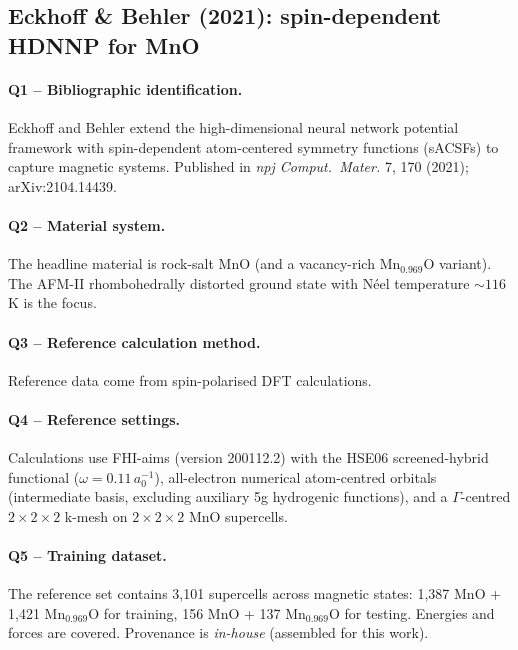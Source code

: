 \subsection{Eckhoff \& Behler (2021): spin-dependent HDNNP for MnO}
\label{sec:appendix-example-eckhoff2021spin}

\paragraph{Q1 -- Bibliographic identification.}
Eckhoff and Behler extend the high-dimensional neural network potential
framework with spin-dependent atom-centered symmetry functions (sACSFs)
to capture magnetic systems. Published in \emph{npj Comput.\ Mater.} 7,
170 (2021); arXiv:2104.14439.


\paragraph{Q2 -- Material system.}
The headline material is rock-salt MnO (and a vacancy-rich
Mn$_{0.969}$O variant). The AFM-II rhombohedrally distorted ground
state with N\'eel temperature ${\sim}116$\,K is the focus.


\paragraph{Q3 -- Reference calculation method.}
Reference data come from spin-polarised DFT calculations.


\paragraph{Q4 -- Reference settings.}
Calculations use FHI-aims (version 200112.2) with the HSE06
screened-hybrid functional ($\omega = 0.11\,a_0^{-1}$), all-electron
numerical atom-centred orbitals (intermediate basis, excluding
auxiliary 5g hydrogenic functions), and a $\Gamma$-centred
$2{\times}2{\times}2$ k-mesh on $2{\times}2{\times}2$ MnO supercells.


\paragraph{Q5 -- Training dataset.}
The reference set contains 3{,}101 supercells across magnetic states:
1{,}387 MnO + 1{,}421 Mn$_{0.969}$O for training, 156 MnO + 137
Mn$_{0.969}$O for testing. Energies and forces are covered.
Provenance is \emph{in-house} (assembled for this work).


